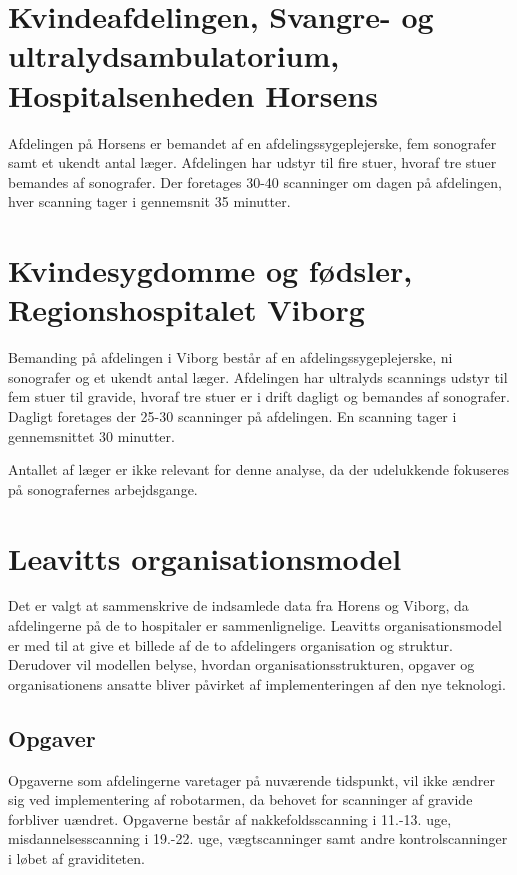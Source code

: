 \section{Kvindeafdelingen, Svangre- og ultralydsambulatorium, Hospitalsenheden Horsens}
Afdelingen på Horsens er bemandet af en afdelingssygeplejerske, fem sonografer samt et ukendt antal læger. Afdelingen har udstyr til fire stuer, hvoraf tre stuer bemandes af sonografer. Der foretages 30-40 scanninger om dagen på afdelingen, hver scanning tager i gennemsnit 35 minutter.

\section{Kvindesygdomme og fødsler, Regionshospitalet Viborg}
Bemanding på afdelingen i Viborg består af en afdelingssygeplejerske, ni sonografer og et ukendt antal læger. Afdelingen har ultralyds scannings udstyr til fem stuer til gravide, hvoraf tre stuer er i drift dagligt og bemandes af sonografer. Dagligt foretages der 25-30 scanninger på afdelingen. En scanning tager i gennemsnittet 30 minutter.

Antallet af læger er ikke relevant for denne analyse, da der udelukkende fokuseres på sonografernes arbejdsgange.

\section{Leavitts organisationsmodel}
Det er valgt at sammenskrive de indsamlede data fra Horens og Viborg, da afdelingerne på de to hospitaler er sammenlignelige. Leavitts organisationsmodel er med til at give et billede af de to afdelingers organisation og struktur. Derudover vil modellen belyse, hvordan organisationsstrukturen, opgaver og organisationens ansatte bliver påvirket af implementeringen af den nye teknologi.


\subsection{Opgaver}
Opgaverne som afdelingerne varetager på nuværende tidspunkt, vil ikke ændrer sig ved implementering af robotarmen, da behovet for scanninger af gravide forbliver uændret. Opgaverne består af nakkefoldsscanning i 11.-13. uge, misdannelsesscanning i 19.-22. uge, vægtscanninger samt andre kontrolscanninger i løbet af graviditeten. \cite{Bergholt2014}

